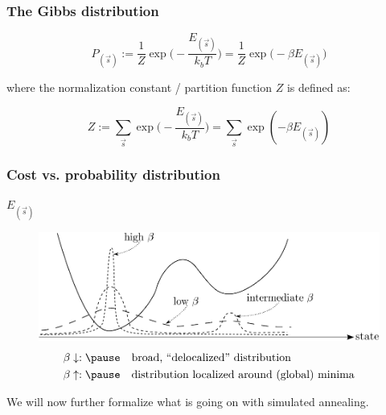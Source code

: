 \begin{frame}\frametitle{The Gibbs distribution}
\begin{equation}  \label{eq:gibbs}
P_{(\vec{s})} := \frac{1}{Z} \exp \Big(-\frac{E_{(\vec s)}}{k_b T}\Big) 
= \frac{1}{Z} \exp \Big(-\beta E_{(\vec s)} \Big) 
\end{equation}

where the normalization constant / partition function $Z$ is defined as:


\begin{equation} \label{eq:partition}
Z := \sum\limits_{\vec{s}} \exp \Big(-\frac{E_{(\vec s)}}{k_b T}\Big) = \sum\limits_{\vec{s}} \exp(-\beta E_{(\vec s)})
\end{equation}


\end{frame}

\begin{frame}\frametitle{Cost vs. probability distribution}

$E_{(\vec{s})}$
\vspace{-0.2cm}
\begin{figure}[h]
  \centering
\includegraphics[width=12cm]{img/section3_fig7}  
\[ \begin{array}{ll}
	\beta \downarrow:\pause
	& \text{broad, ``delocalized'' distribution} \\\vspace{-0.3cm}\\
	\beta \uparrow:\pause
	& \text{distribution localized around (global) minima}
\end{array} \]
\end{figure}


\end{frame}

\newpage


We will now further formalize what is going on with simulated annealing.

